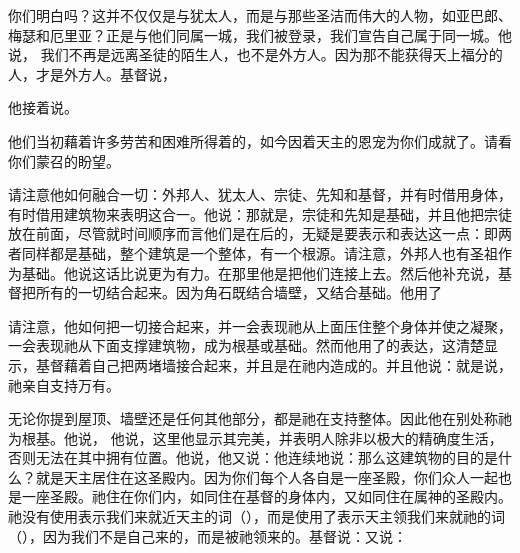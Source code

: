 你们明白吗？这并不仅仅是与犹太人，而是与那些圣洁而伟大的人物，如亚巴郎、梅瑟和厄里亚？正是与他们同属一城，我们被登录，我们宣告自己属于同一城。他说， 我们不再是远离圣徒的陌生人，也不是外方人。因为那不能获得天上福分的人，才是外方人。基督说，\par

他接着说。\par

他们当初藉着许多劳苦和困难所得着的，如今因着天主的恩宠为你们成就了。请看你们蒙召的盼望。\par

\par

请注意他如何融合一切：外邦人、犹太人、宗徒、先知和基督，并有时借用身体，有时借用建筑物来表明这合一。他说：那就是，宗徒和先知是基础，并且他把宗徒放在前面，尽管就时间顺序而言他们是在后的，无疑是要表示和表达这一点：即两者同样都是基础，整个建筑是一个整体，有一个根源。请注意，外邦人也有圣祖作为基础。他说这话比说更为有力。在那里他是把他们连接上去。然后他补充说，基督把所有的一切结合起来。因为角石既结合墙壁，又结合基础。他用了\par

\par

请注意，他如何把一切接合起来，并一会表现祂从上面压住整个身体并使之凝聚，一会表现祂从下面支撑建筑物，成为根基或基础。然而他用了的表达，这清楚显示，基督藉着自己把两堵墙接合起来，并且是在祂内造成的。并且他说：就是说，祂亲自支持万有。\par

\par

无论你提到屋顶、墙壁还是任何其他部分，都是祂在支持整体。因此他在别处称祂为根基。他说， 他说，这里他显示其完美，并表明人除非以极大的精确度生活，否则无法在其中拥有位置。他说，他又说：他连续地说：那么这建筑物的目的是什么？就是天主居住在这圣殿内。因为你们每个人各自是一座圣殿，你们众人一起也是一座圣殿。祂住在你们内，如同住在基督的身体内，又如同住在属神的圣殿内。祂没有使用表示我们来就近天主的词（），而是使用了表示天主领我们来就祂的词（），因为我们不是自己来的，而是被祂领来的。基督说：又说：\par

